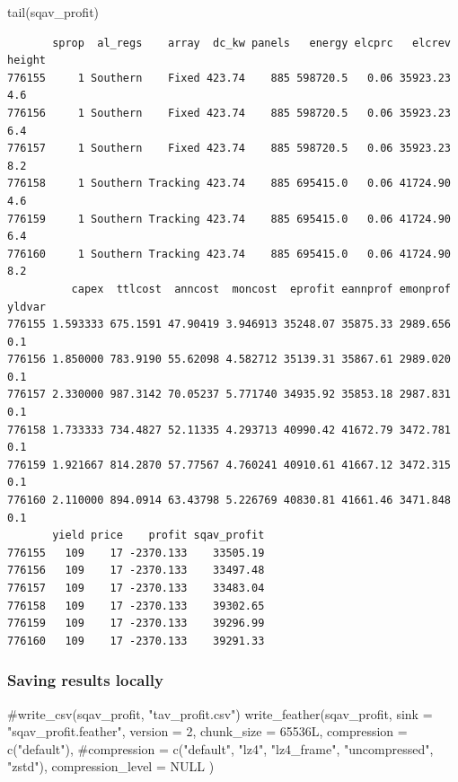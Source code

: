 \documentclass[
  letterpaper,
  DIV=11,
  numbers=noendperiod]{scrartcl}
\newenvironment{Shaded}{\begin{snugshade}}{\end{snugshade}}
\newcommand{\AttributeTok}[1]{\textcolor[rgb]{0.40,0.45,0.13}{#1}}
\newcommand{\CommentTok}[1]{\textcolor[rgb]{0.37,0.37,0.37}{#1}}
\newcommand{\ConstantTok}[1]{\textcolor[rgb]{0.56,0.35,0.01}{#1}}
\newcommand{\DecValTok}[1]{\textcolor[rgb]{0.68,0.00,0.00}{#1}}
\newcommand{\FunctionTok}[1]{\textcolor[rgb]{0.28,0.35,0.67}{#1}}
\newcommand{\NormalTok}[1]{\textcolor[rgb]{0.00,0.23,0.31}{#1}}
\newcommand{\StringTok}[1]{\textcolor[rgb]{0.13,0.47,0.30}{#1}}
\begin{document}
\begin{Shaded}
\begin{Highlighting}[]
\FunctionTok{tail}\NormalTok{(sqav\_profit)}
\end{Highlighting}
\end{Shaded}

\begin{verbatim}
       sprop  al_regs    array  dc_kw panels   energy elcprc   elcrev height
776155     1 Southern    Fixed 423.74    885 598720.5   0.06 35923.23    4.6
776156     1 Southern    Fixed 423.74    885 598720.5   0.06 35923.23    6.4
776157     1 Southern    Fixed 423.74    885 598720.5   0.06 35923.23    8.2
776158     1 Southern Tracking 423.74    885 695415.0   0.06 41724.90    4.6
776159     1 Southern Tracking 423.74    885 695415.0   0.06 41724.90    6.4
776160     1 Southern Tracking 423.74    885 695415.0   0.06 41724.90    8.2
          capex  ttlcost  anncost  moncost  eprofit eannprof emonprof yldvar
776155 1.593333 675.1591 47.90419 3.946913 35248.07 35875.33 2989.656    0.1
776156 1.850000 783.9190 55.62098 4.582712 35139.31 35867.61 2989.020    0.1
776157 2.330000 987.3142 70.05237 5.771740 34935.92 35853.18 2987.831    0.1
776158 1.733333 734.4827 52.11335 4.293713 40990.42 41672.79 3472.781    0.1
776159 1.921667 814.2870 57.77567 4.760241 40910.61 41667.12 3472.315    0.1
776160 2.110000 894.0914 63.43798 5.226769 40830.81 41661.46 3471.848    0.1
       yield price    profit sqav_profit
776155   109    17 -2370.133    33505.19
776156   109    17 -2370.133    33497.48
776157   109    17 -2370.133    33483.04
776158   109    17 -2370.133    39302.65
776159   109    17 -2370.133    39296.99
776160   109    17 -2370.133    39291.33
\end{verbatim}

\subsubsection{Saving results locally}\label{saving-results-locally-2}

\begin{Shaded}
\begin{Highlighting}[]
\CommentTok{\#write\_csv(sqav\_profit, "tav\_profit.csv")}
\FunctionTok{write\_feather}\NormalTok{(sqav\_profit,}
  \AttributeTok{sink =} \StringTok{"sqav\_profit.feather"}\NormalTok{,}
  \AttributeTok{version =} \DecValTok{2}\NormalTok{,}
  \AttributeTok{chunk\_size =} \DecValTok{65536}\NormalTok{L,}
  \AttributeTok{compression =} \FunctionTok{c}\NormalTok{(}\StringTok{"default"}\NormalTok{),}
  \CommentTok{\#compression = c("default", "lz4", "lz4\_frame", "uncompressed", "zstd"),}
  \AttributeTok{compression\_level =} \ConstantTok{NULL}
\NormalTok{)}
\end{Highlighting}
\end{Shaded}
\end{document}
